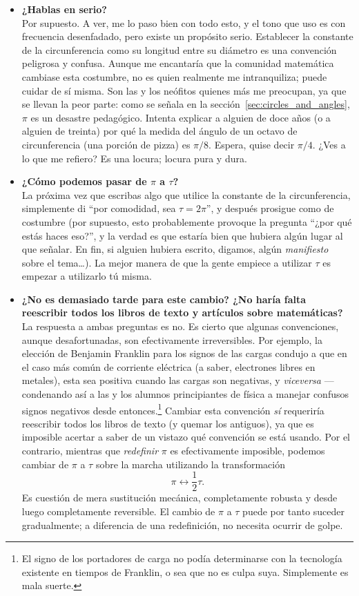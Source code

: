\begin{itemize}

  \item \textbf{¿Hablas en serio?} \\ Por supuesto. A ver, me lo paso bien con todo esto, y el tono que uso es con frecuencia desenfadado, pero existe un propósito serio. Establecer la constante de la circunferencia como su longitud entre su diámetro es una convención peligrosa y confusa. Aunque me encantaría que la comunidad matemática cambiase esta costumbre, no es quien realmente me intranquiliza; puede cuidar de sí misma. Son las y los neófitos quienes más me preocupan, ya que se llevan la peor parte: como se señala en la sección~\ref{sec:circles_and_angles}, $\pi$ es un desastre pedagógico. Intenta explicar a alguien de doce años (o a alguien de treinta) por qué la medida del ángulo de un octavo de circunferencia (una porción de pizza) es $\pi/8$. Espera, quise decir $\pi/4$. ¿Ves a lo que me refiero? Es una locura; locura pura y dura.

  \item \textbf{¿Cómo podemos pasar de $\pi$ a $\tau$?} \\ La próxima vez que escribas algo que utilice la constante de la circunferencia, simplemente di ``por comodidad, sea $\tau = 2\pi$'', y después prosigue como de costumbre (por supuesto, esto probablemente provoque la pregunta ``¿por qué estás haces eso?'', y la verdad es que estaría bien que hubiera algún lugar al que señalar. En fin, si alguien hubiera escrito, digamos, algún \emph{manifiesto} sobre el tema\ldots). La mejor manera de que la gente empiece a utilizar $\tau$ es empezar a utilizarlo tú misma.

  \item \textbf{¿No es demasiado tarde para este cambio? ¿No haría falta reescribir todos los libros de texto y artículos sobre matemáticas?} \\ La respuesta a ambas preguntas es no. Es cierto que algunas convenciones, aunque desafortunadas, son efectivamente irreversibles. Por ejemplo, la elección de Benjamin Franklin para los signos de las cargas condujo a que en el caso más común de corriente eléctrica (a saber, electrones libres en metales), esta sea positiva cuando las cargas son negativas, y \emph{viceversa} ---condenando así a las y los alumnos principiantes de física a manejar confusos signos negativos desde entonces.\footnote{El signo de los portadores de carga no podía determinarse con la tecnología existente en tiempos de Franklin, o sea que no es culpa suya. Simplemente es mala suerte.} Cambiar esta convención \emph{sí} requeriría reescribir todos los libros de texto (y quemar los antiguos), ya que es imposible acertar a saber de un vistazo qué convención se está usando. Por el contrario, mientras que \emph{redefinir} $\pi$ es efectivamente imposible, podemos cambiar de $\pi$ a $\tau$ sobre la marcha utilizando la transformación \[ \pi \leftrightarrow \textstyle{\frac{1}{2}}\tau. \] Es cuestión de mera sustitución mecánica, completamente robusta y desde luego completamente reversible. El cambio de  $\pi$ a $\tau$ puede por tanto suceder gradualmente; a diferencia de una redefinición, no necesita ocurrir de golpe.


\end{itemize}
